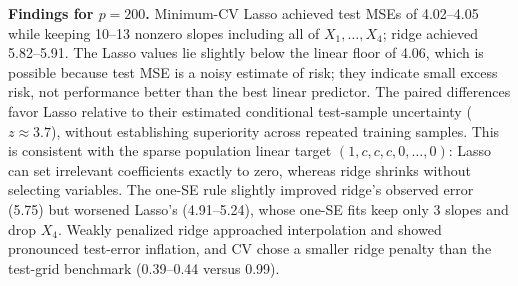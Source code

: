 \documentclass[answers,12pt,addpoints]{exam}
\begin{document}
\begin{questions}
\begin{solution}
\textbf{Findings for $p=200$.}
Minimum-CV Lasso achieved test MSEs of 4.02--4.05 while keeping
10--13 nonzero slopes including all of $X_1,\ldots,X_4$; ridge
achieved 5.82--5.91. The Lasso values lie slightly below the linear
floor of 4.06, which is possible because test MSE is a noisy
estimate of risk; they indicate small excess risk, not performance
better than the best linear predictor. The paired differences favor
Lasso relative to their estimated conditional test-sample uncertainty
($z\approx3.7$), without establishing superiority across repeated
training samples. This is consistent with the sparse population
linear target $(1,c,c,c,0,\ldots,0)$: Lasso can set irrelevant
coefficients exactly to zero, whereas ridge shrinks without selecting
variables. The one-SE rule slightly improved ridge's observed error
(5.75) but worsened Lasso's (4.91--5.24), whose one-SE fits keep only
3 slopes and drop $X_4$. Weakly penalized ridge approached
interpolation and showed pronounced test-error inflation, and CV chose
a smaller ridge penalty than the test-grid benchmark (0.39--0.44
versus 0.99).

\end{solution}

\end{questions}
\end{document}
